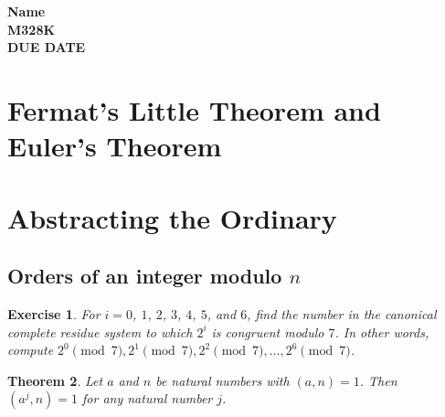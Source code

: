 \documentclass[11pt,leqno]{article}
\newtheorem{thm}{Theorem}[section]
\newtheorem{exer}[thm]{Exercise}
\theoremstyle{definition}
\begin{document}
\thispagestyle{plain}
\begin{flushright}
\large{\textbf{Name \\
M328K  \\
DUE DATE \\}}
\end{flushright}



\setcounter{tocdepth}{3}




\setcounter{section}{3}

\setcounter{thm}{0}


\section{Fermat's Little Theorem and Euler's Theorem}


\section*{Abstracting the Ordinary}


\subsection*{Orders of an integer modulo $n$}


\begin{exer}For $i = 0$, $1$, $2$, $3$, $4$, $5$, and $6$,
find the number in the canonical complete residue
system to which
$2^i$ is congruent modulo $7$.  In other words, compute
$2^0\pmod{7}, 2^1\pmod{7}, 2^2\pmod{7}, \dots, 2^6\pmod{7}$.
\end{exer}


\begin{thm}
Let $a$ and $n$ be natural numbers with $(a, n) = 1$.  Then $(a^j,
n) = 1$ for any natural number $j$.
\end{thm}

\end{document}
